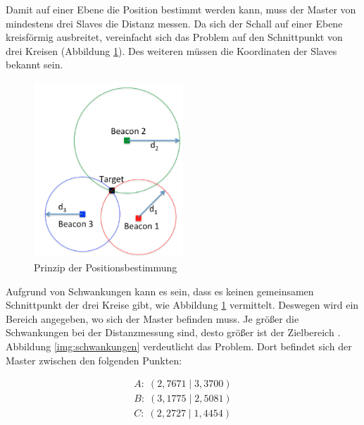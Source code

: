Damit auf einer Ebene die Position bestimmt werden kann, muss der Master von mindestens drei Slaves die Distanz messen. Da sich der Schall auf einer Ebene kreisförmig ausbreitet, vereinfacht sich das Problem auf den Schnittpunkt von drei Kreisen (Abbildung \ref{img:positionsbestimmung}). Des weiteren müssen die Koordinaten der Slaves bekannt sein.
\begin{figure}[H]
        \centering
        \includegraphics[width=0.5\textwidth]{images/positionsbestimmung.png}
        \caption{Prinzip der Positionsbestimmung}
        \label{img:positionsbestimmung}
\end{figure}
Aufgrund von Schwankungen kann es sein, dass es keinen gemeinsamen Schnittpunkt der drei Kreise gibt, wie Abbildung \ref{img:positionsbestimmung} vermittelt. Deswegen wird ein Bereich angegeben, wo sich der Master befinden muss. Je größer die Schwankungen bei der Distanzmessung sind, desto größer ist der Zielbereich \cite{src_MATH_TDOA}. Abbildung \ref{img:schwankungen} verdeutlicht das Problem. Dort befindet sich der Master zwischen den folgenden Punkten:

\begin{equation}
\begin{split}
A: \; (2,7671\;|\;3,3700) \\
B: \; (3,1775\;|\;2,5081) \\
C: \; (2,2727\;|\;1,4454)
\end{split}
\end{equation}


